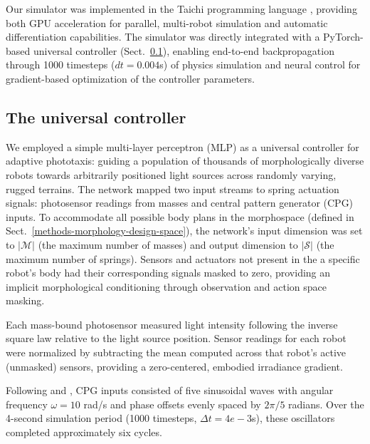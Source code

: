 Our simulator was implemented in the Taichi programming language \cite{hu2019difftaichi}, providing both GPU acceleration for parallel, multi-robot simulation and automatic differentiation capabilities. The simulator was directly integrated with a PyTorch-based universal controller (Sect.~\ref{methods-universal-control}), enabling end-to-end backpropagation through 1000 timesteps ($dt = 0.004$s) of physics simulation and neural control for gradient-based optimization of the controller parameters.







\subsection{The universal controller}
\label{methods-universal-control}

We employed a simple multi-layer perceptron (MLP) as a universal controller for adaptive phototaxis: guiding a population of thousands of morphologically diverse robots towards arbitrarily positioned light sources across randomly varying, rugged terrains.
The network mapped two input streams to spring actuation signals: photosensor readings from masses and central pattern generator (CPG) inputs. 
To accommodate all possible body plans in the morphospace (defined in Sect.~\ref{methods-morphology-design-space}), the network's input dimension was set to $|\mathcal{M}|$ (the maximum number of masses) and output dimension to $|\mathcal{S}|$ (the maximum number of springs). Sensors and actuators not present in the a specific robot's body had their corresponding signals masked to zero, providing an implicit morphological conditioning through observation and action space masking.

Each mass-bound photosensor measured light intensity following the inverse square law relative to the light source position. 
Sensor readings for each robot were normalized by subtracting the mean computed across that robot's active (unmasked) sensors, providing a zero-centered, embodied irradiance gradient. 

Following \citet{hu2019difftaichi} and \citet{strgar2024evolution},
CPG inputs consisted of five sinusoidal waves with angular frequency $\omega=10$ rad/s and phase offsets evenly spaced by $2\pi/5$ radians. Over the 4-second simulation period (1000 timesteps, $\Delta t=4e-3$s), these oscillators completed approximately six cycles.

